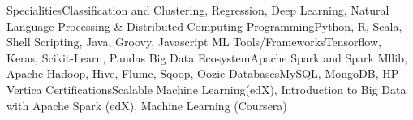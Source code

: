 \begin{cvskills}
\cvskill
{Specialities}{Classification and Clustering, Regression, Deep Learning, Natural Language Processing \& Distributed Computing}
\cvskill
{Programming}{Python, R, Scala, Shell Scripting, Java, Groovy, Javascript}
\cvskill
{ML Tools/Frameworks}{Tensorflow, Keras, Scikit-Learn, Pandas}
\cvskill
{Big Data Ecosystem}{Apache Spark and Spark Mllib, Apache Hadoop, Hive, Flume, Sqoop, Oozie}
\cvskill
{Databases}{MySQL, MongoDB, HP Vertica}
\cvskill
{Certifications}{Scalable Machine Learning(edX), Introduction to Big Data with Apache Spark (edX), Machine Learning (Coursera)}
\end{cvskills}

